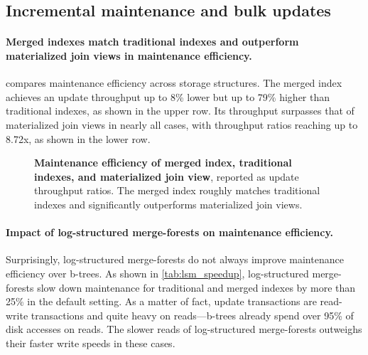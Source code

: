 \documentclass[biblatex, english]{lni}
\begin{document}
\subsection{Incremental maintenance and bulk updates}\label{ssec:maintenance}

\paragraph{Merged indexes match traditional indexes and outperform materialized join views in maintenance efficiency.}

 compares maintenance efficiency across storage structures.
The merged index achieves an update throughput up to 8\% lower but up to 79\% higher than traditional indexes, as shown in the upper row.
Its throughput surpasses that of materialized join views in nearly all cases, with throughput ratios reaching up to 8.72x, as shown in the lower row.

\begin{figure}[htb]
    \centering
    \caption{
        \textbf{Maintenance efficiency of merged index, traditional indexes, and materialized join view}, reported as update throughput ratios.
        The merged index roughly matches traditional indexes and significantly outperforms materialized join views.}\label{fig:maintenance}
\end{figure}

\paragraph{Impact of log-structured merge-forests on maintenance efficiency.}

Surprisingly, log-structured merge-forests do not always improve maintenance efficiency over b-trees.
As shown in \cref{tab:lsm_speedup}, log-structured merge-forests slow down maintenance for traditional and merged indexes by more than 25\% in the default setting.
As a matter of fact, update transactions are read-write transactions and quite heavy on reads---b-trees already spend over 95\% of disk accesses on reads.
The slower reads of log-structured merge-forests outweighs their faster write speeds in these cases.
\end{document}
